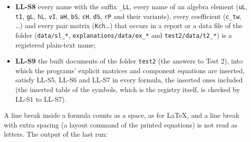 \documentclass[
  10pt,
]{article}
\begin{document}
\begin{itemize}
  registered;
\item
  \textbf{LL-S8} every name with the suffix \texttt{\_LL}, every name of
  an algebra element (\texttt{uL}, \texttt{tI}, \texttt{gL},
  \texttt{hL}, \texttt{vI}, \texttt{aH}, \texttt{bS}, \texttt{cH},
  \texttt{dS}, \texttt{rP} and their variants), every coefficient
  (\texttt{c\_tw}, \ldots) and every pair matrix (\texttt{Kch}\ldots)
  that occurs in a report or a data file of the folder
  (\texttt{data/sl\_*}, \texttt{explanations/data/ex\_*} and
  \texttt{test2/data/t2\_*}) is a registered plain-text name;
\item
  \textbf{LL-S9} the built documents of the folder \texttt{test2} (the
  answers to Test 2), into which the programs' explicit matrices and
  component equations are inserted, satisfy LL-S5, LL-S6 and LL-S7 in
  every formula, the inserted ones included (the inserted table of the
  symbols, which is the registry itself, is checked by LL-S1 to LL-S7).
\end{itemize}

A line break inside a formula counts as a space, as for LaTeX, and a
line break with extra spacing (a layout command of the printed
equations) is not read as letters. The output of the last run:
\end{document}
